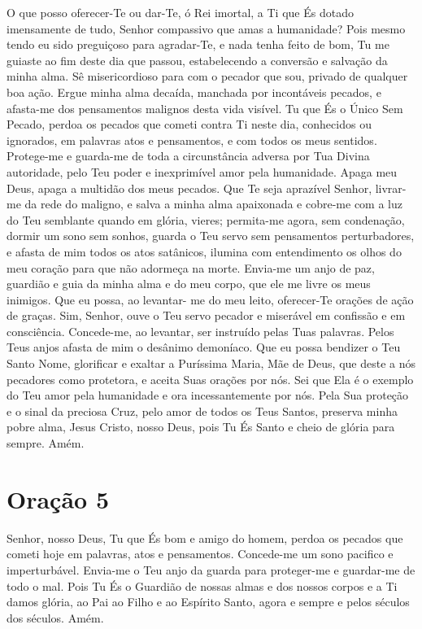 \documentclass{subfiles}
\begin{document}
O que posso oferecer-Te ou dar-Te, ó Rei imortal, a Ti que És dotado 
imensamente de tudo, Senhor compassivo que amas a humanidade? Pois 
mesmo tendo eu sido preguiçoso para agradar-Te, e nada tenha feito de bom, 
Tu me guiaste ao fim deste dia que passou, estabelecendo a conversão e 
salvação da minha alma. Sê misericordioso para com o pecador que sou, 
privado de qualquer boa ação. Ergue minha alma decaída, manchada por 
incontáveis pecados, e afasta-me dos pensamentos malignos desta vida visível. 
Tu que És o Único Sem Pecado, perdoa os pecados que cometi contra Ti neste 
dia, conhecidos ou ignorados, em palavras atos e pensamentos, e com todos 
os meus sentidos. Protege-me e guarda-me de toda a circunstância adversa 
por Tua Divina autoridade, pelo Teu poder e inexprimível amor pela 
humanidade. Apaga meu Deus, apaga a multidão dos meus pecados. Que Te 
seja aprazível Senhor, livrar-me da rede do maligno, e salva a minha alma 
apaixonada e cobre-me com a luz do Teu semblante quando em glória, vieres; 
permita-me agora, sem condenação, dormir um sono sem sonhos, guarda o 
Teu servo sem pensamentos perturbadores, e afasta de mim todos os atos 
satânicos, ilumina com entendimento os olhos do meu coração para que não 
adormeça na morte. Envia-me um anjo de paz, guardião e guia da minha alma 
e do meu corpo, que ele me livre os meus inimigos. Que eu possa, ao levantar-
me do meu leito, oferecer-Te orações de ação de graças. Sim, Senhor, ouve o 
Teu servo pecador e miserável em confissão e em consciência. Concede-me, 
ao levantar, ser instruído pelas Tuas palavras. Pelos Teus anjos afasta de mim 
o desânimo demoníaco. Que eu possa bendizer o Teu Santo Nome, glorificar e 
exaltar a Puríssima Maria, Mãe de Deus, que deste a nós pecadores como 
protetora, e aceita Suas orações por nós. Sei que Ela é o exemplo do Teu amor 
pela humanidade e ora incessantemente por nós. Pela Sua proteção e o sinal 
da preciosa Cruz, pelo amor de todos os Teus Santos, preserva minha pobre 
alma, Jesus Cristo, nosso Deus, pois Tu És Santo e cheio de glória para sempre.
Amém.

\section*{Oração 5}

Senhor, nosso Deus, Tu que És bom e amigo do homem, perdoa os pecados que cometi
hoje em palavras, atos e pensamentos. Concede-me um sono pacifico e
imperturbável. Envia-me o Teu anjo da guarda para proteger-me e guardar-me de
todo o mal. Pois Tu És o Guardião de nossas almas e dos nossos corpos e a Ti
damos glória, ao Pai ao Filho e ao Espírito Santo, agora e sempre e pelos
séculos dos séculos. Amém. 
\end{document}
